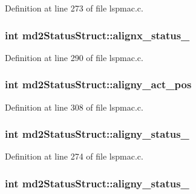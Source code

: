 Definition at line 273 of file lspmac.\-c.

\hypertarget{structmd2StatusStruct_a2feb35ceab8129fd2cc34d1104af8b8f}{
\subsubsection[{alignx\-\_\-status\-\_\-2}]{\setlength{\rightskip}{0pt plus 5cm}int md2\-Status\-Struct\-::alignx\-\_\-status\-\_}}\label{structmd2StatusStruct_a2feb35ceab8129fd2cc34d1104af8b8f}


Definition at line 290 of file lspmac.\-c.

\hypertarget{structmd2StatusStruct_a0d40a01d2aa93c443526e826440f77fc}{
\subsubsection[{aligny\-\_\-act\-\_\-pos}]{\setlength{\rightskip}{0pt plus 5cm}int md2\-Status\-Struct\-::aligny\-\_\-act\-\_\-pos}}\label{structmd2StatusStruct_a0d40a01d2aa93c443526e826440f77fc}


Definition at line 308 of file lspmac.\-c.

\hypertarget{structmd2StatusStruct_a2f2a11fe2fc7a446323def2be465185a}{
\subsubsection[{aligny\-\_\-status\-\_\-1}]{\setlength{\rightskip}{0pt plus 5cm}int md2\-Status\-Struct\-::aligny\-\_\-status\-\_}}\label{structmd2StatusStruct_a2f2a11fe2fc7a446323def2be465185a}


Definition at line 274 of file lspmac.\-c.

\hypertarget{structmd2StatusStruct_a1f98d8b9831e32d77129f9b0f1d7d255}{
\subsubsection[{aligny\-\_\-status\-\_\-2}]{\setlength{\rightskip}{0pt plus 5cm}int md2\-Status\-Struct\-::aligny\-\_\-status\-\_}}\label{structmd2StatusStruct_a1f98d8b9831e32d77129f9b0f1d7d255}


